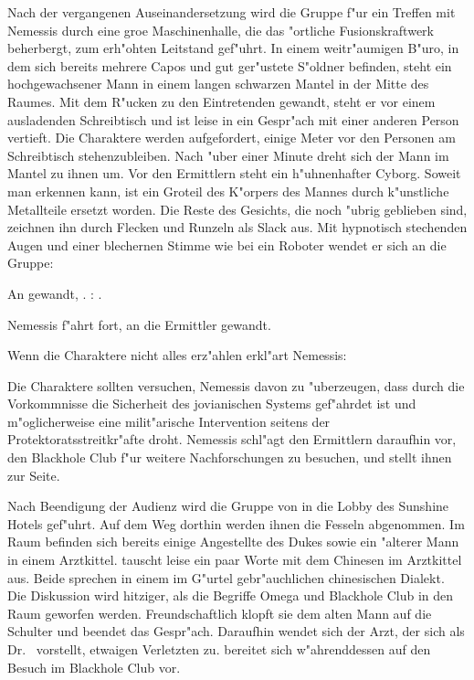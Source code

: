 
Nach der vergangenen Auseinandersetzung wird die Gruppe f"ur ein Treffen mit Nemessis durch eine gro\3e Maschinenhalle, die das "ortliche Fusionskraftwerk beherbergt, zum erh"ohten Leitstand gef"uhrt. In einem weitr"aumigen B"uro, in dem sich bereits mehrere Capos und gut ger"ustete S"oldner befinden, steht ein hochgewachsener Mann in einem langen schwarzen Mantel in der Mitte des Raumes. Mit dem R"ucken zu den Eintretenden gewandt, steht er vor einem ausladenden Schreibtisch und ist leise in ein Gespr"ach mit einer anderen Person vertieft. Die Charaktere werden aufgefordert, einige Meter vor den Personen am Schreibtisch stehenzubleiben. Nach "uber einer Minute dreht sich der Mann im Mantel zu ihnen um. Vor den Ermittlern steht ein h"uhnenhafter Cyborg. Soweit man erkennen kann, ist ein Gro\3teil des K"orpers des Mannes durch k"unstliche Metallteile ersetzt worden. Die Reste des Gesichts, die noch "ubrig geblieben sind, zeichnen ihn durch Flecken und Runzeln als Slack aus. Mit hypnotisch stechenden Augen und einer blechernen Stimme wie bei ein Roboter wendet er sich an die Gruppe:


An \xl{} gewandt, . \xl{}: . 

Nemessis f"ahrt fort, an die Ermittler gewandt.


Wenn die Charaktere nicht alles erz"ahlen erkl"art Nemessis:


Die Charaktere sollten versuchen, Nemessis davon zu "uberzeugen, dass durch die Vorkommnisse die Sicherheit des jovianischen Systems gef"ahrdet ist und m"oglicherweise eine milit"arische Intervention seitens der Protektoratsstreitkr"afte droht. Nemessis schl"agt den Ermittlern daraufhin vor, den Blackhole Club f"ur weitere Nachforschungen zu besuchen, und stellt ihnen \xl{} zur Seite.

Nach Beendigung der Audienz wird die Gruppe von \xl{} in die Lobby des Sunshine Hotels gef"uhrt. Auf dem Weg dorthin werden ihnen die Fesseln abgenommen. Im Raum befinden sich bereits einige Angestellte des Dukes sowie ein "alterer Mann in einem Arztkittel. \xl{} tauscht leise ein paar Worte mit dem Chinesen im Arztkittel aus. Beide sprechen in einem im G"urtel gebr"auchlichen chinesischen Dialekt. Die Diskussion wird hitziger, als die Begriffe Omega und Blackhole Club in den Raum geworfen werden. Freundschaftlich klopft sie dem alten Mann auf die Schulter und beendet das Gespr"ach. Daraufhin wendet sich der Arzt, der sich als Dr.~  vorstellt, etwaigen Verletzten zu. \xl{} bereitet sich w"ahrenddessen auf den Besuch im Blackhole Club vor.


